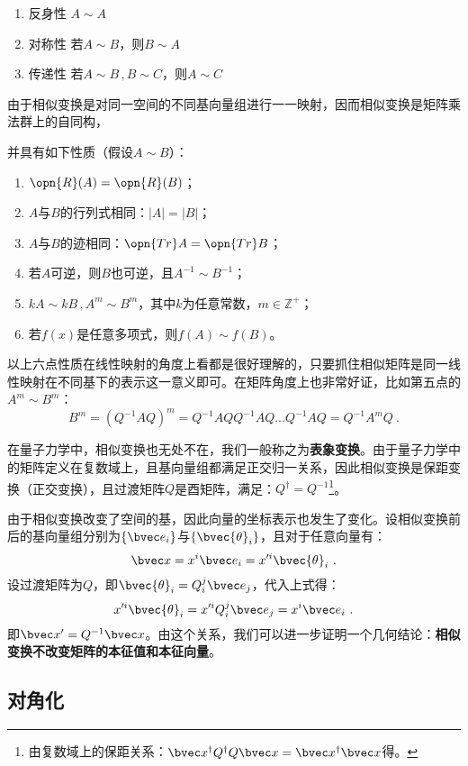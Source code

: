 \begin{enumerate}
\item 反身性 $A\sim A$ 
\item 对称性 若$A\sim B$，则$B\sim A$
\item 传递性 若$A\sim B\,,B\sim C$，则$A\sim C$
\end{enumerate}
由于相似变换是对同一空间的不同基向量组进行一一映射，因而相似变换是矩阵乘法群上的自同构，

并具有如下性质（假设$A\sim B$）：
\begin{enumerate}
\item $\opn{R}(A)=\opn{R}(B)$；
\item $A$与$B$的行列式相同：$|A|=|B|$；
\item $A$与$B$的迹相同：$\opn{Tr}A=\opn{Tr}B$；
\item 若$A$可逆，则$B$也可逆，且$A^{-1}\sim B^{-1}$；
\item $kA\sim kB\,,A^m\sim B^m$，其中$k$为任意常数，$m\in \mathbb Z^{+}$；
\item 若$f(x)$是任意多项式，则$f(A)\sim f(B)$。
\end{enumerate}
以上六点性质在线性映射的角度上看都是很好理解的，只要抓住相似矩阵是同一线性映射在不同基下的表示这一意义即可。在矩阵角度上也非常好证，比如第五点的$A^m\sim B^m$：\begin{equation}
B^m=(Q^{-1}AQ)^m=Q^{-1}AQQ^{-1}AQ...Q^{-1}AQ=Q^{-1}A^mQ~.
\end{equation}

在量子力学中，相似变换也无处不在，我们一般称之为\textbf{表象变换}。由于量子力学中的矩阵定义在复数域上，且基向量组都满足正交归一关系，因此相似变换是保距变换（正交变换），且过渡矩阵$Q$是酉矩阵，满足：$Q^{\dagger}=Q^{-1}$\footnote{由复数域上的保距关系：$\bvec x^{\dagger}Q^{\dagger}Q\bvec x=\bvec x^{\dagger}\bvec x$得。}。

由于相似变换改变了空间的基，因此向量的坐标表示也发生了变化。设相似变换前后的基向量组分别为$\{\bvec e_i\}$与$\{\bvec {\theta}_i\}$，且对于任意向量有：
\begin{equation}
\bvec x=x^i\bvec e_i=x'^i\bvec {\theta}_i~.
\end{equation}
设过渡矩阵为$Q$，即$\bvec{\theta}_i=Q^j_i\bvec e_j$，代入上式得：
\begin{equation}
x'^i\bvec {\theta}_i=x'^iQ^j_i\bvec e_j=x^i\bvec e_i~.
\end{equation}
即$\bvec x'=Q^{-1}\bvec x$。由这个关系，我们可以进一步证明一个几何结论：\textbf{相似变换不改变矩阵的本征值和本征向量}。
\subsection{对角化}

